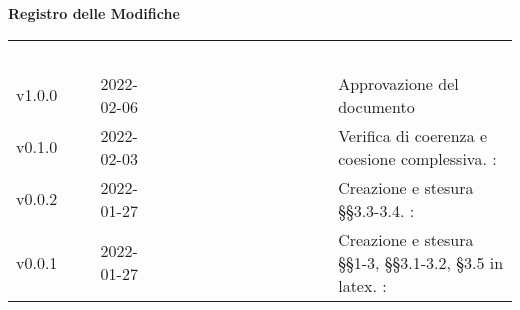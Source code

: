 

{\LARGE{\textbf{Registro delle Modifiche}}} \\
\begin{table}[!htbp]
\renewcommand{\arraystretch}{1.5}
\begin{tabular}{ m{}<{\centering}  m{}<{\centering}  m{}<{\centering}  m{}<{\centering}  m{}<{\centering} }
	\rowcolor{darkblue}
	\textcolor{white}{\textbf{Versione}} &\textcolor{white}{\textbf{Data}}& \textcolor{white}{\textbf{Nominativo}} & \textcolor{white}{\textbf{Ruolo}}&\textcolor{white}{\textbf{Descrizione}}\\ 

	v1.0.0 & 2022-02-06 & \MG{} & \RE & Approvazione del documento \\

	v0.1.0& 2022-02-03 & \FP & \VE & Verifica di coerenza e coesione complessiva. \VE: \textit{\PV}\\

	v0.0.2& 2022-01-27& \FP &\AN & Creazione e stesura \S\S{}3.3-3.4. \VE: \textit{\PV}\\

	v0.0.1& 2022-01-27& \GC &\AN & Creazione e stesura \S\S{}1-3, \S\S{}3.1-3.2, \S3.5 in latex. \VE: \textit{\PV}\\

\end{tabular}
\end{table}

\pagebreak